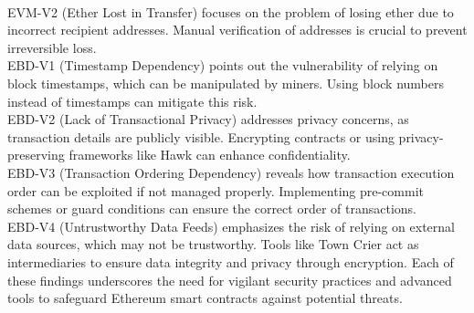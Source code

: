 \documentclass[12pt,a4paper]{article}
\begin{document}
\begin{itemize}
\begin{itemize}
\\
EVM-V2 (Ether Lost in Transfer) focuses on the problem of losing ether due to incorrect recipient addresses. Manual verification of addresses is crucial to prevent irreversible loss.
\\ 
EBD-V1 (Timestamp Dependency) points out the vulnerability of relying on block timestamps, which can be manipulated by miners. Using block numbers instead of timestamps can mitigate this risk.
\\ 
EBD-V2 (Lack of Transactional Privacy) addresses privacy concerns, as transaction details are publicly visible. Encrypting contracts or using privacy-preserving frameworks like Hawk can enhance confidentiality.
\\ 
EBD-V3 (Transaction Ordering Dependency) reveals how transaction execution order can be exploited if not managed properly. Implementing pre-commit schemes or guard conditions can ensure the correct order of transactions.
\\
EBD-V4 (Untrustworthy Data Feeds) emphasizes the risk of relying on external data sources, which may not be trustworthy. Tools like Town Crier act as intermediaries to ensure data integrity and privacy through encryption. Each of these findings underscores the need for vigilant security practices and advanced tools to safeguard Ethereum smart contracts against potential threats.

\end{itemize}


\end{itemize}
\end{document}
